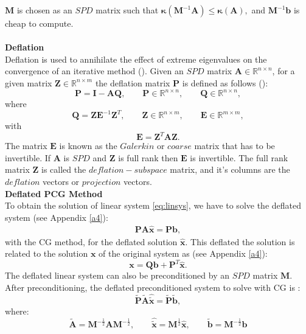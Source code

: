 \documentclass[12pt]{article}
\begin{document}
$\mathbf{M}$ is chosen as an $SPD$ matrix such that $\mathbf{\kappa}(\mathbf{M}^{-1}\mathbf{A})\leq \mathbf{\kappa}(\mathbf{A}),$ and $\mathbf{M}^{-1}\mathbf{b}$ is cheap to compute.\\\\
\textbf{Deflation}\\
Deflation is used to annihilate the effect of extreme eigenvalues on the convergence of an iterative method (\cite{Vuik99}). 
Given an $SPD$ matrix $\mathbf{A} \in \mathbb{R}^{n \times n}$, for a given matrix $\mathbf{Z}\in \mathbb{R}^{n\times m}$ the deflation matrix $\mathbf{P}$ is defined as follows (\cite{Tang08,Tang09}):
$$\mathbf{P}=\mathbf{I}-\mathbf{A}\mathbf{Q}, \qquad \mathbf{P} \in \mathbb{R}^{n \times n}, \qquad \mathbf{Q} \in \mathbb{R}^{n \times n},$$
where
$$\mathbf{Q}=\mathbf{Z}\mathbf{E}^{-1}\mathbf{Z}^T, \qquad \mathbf{Z} \in \mathbb{R}^{n \times m}, \qquad \mathbf{E} \in \mathbb{R}^{m \times m}, $$
with
$$\mathbf{E}=\mathbf{Z}^T\mathbf{A}\mathbf{Z}.$$
The matrix $\mathbf{E}$ is known as the $Galerkin$ or $coarse$ matrix that has to be invertible. 
If $\mathbf{A}$ is $SPD$ and $\mathbf{Z}$ is full rank then $\mathbf{E}$ is invertible. 
The full rank matrix $\mathbf{Z}$ is called the $deflation-subspace$ matrix, 
and it's columns are the
$deflation$ vectors or $projection$ vectors.\\
\textbf{Deflated PCG Method}\\
\hspace{0.5cm}To obtain the solution of linear system \eqref{eq:linsys}, we have to solve the deflated system (see Appendix \ref{a4}):
\begin{align}\label{eq:defsol}
\mathbf{P}\mathbf{A} \hat{\mathbf{x}}=\mathbf{P}\mathbf{b},
\end{align}
with the CG method, for the deflated solution $\hat{\mathbf{x}}$. 
This deflated the solution is related to the solution $\mathbf{x}$ of the original system as (see Appendix \ref{a4}):
\begin{equation}\label{eq:xfromxh}
    \mathbf{x}=\mathbf{Q}\mathbf{b}+\mathbf{P}^T\mathbf{\hat{x}}.
\end{equation}
The deflated linear system can also be preconditioned by an $SPD$ matrix $\mathbf{M}$. After preconditioning, the deflated preconditioned system to solve with CG is \cite{Tang09}:
$$\tilde{\mathbf{P}} \tilde{\mathbf{A}} \hat{\tilde{\mathbf{x}}}=\tilde{\mathbf{P}}\tilde{\mathbf{b}},$$
where:
\begin{equation*}
 \tilde{\mathbf{A}}=\mathbf{M}^{-\frac{1}{2}}\mathbf{A}\mathbf{M}^{-\frac{1}{2}}, \qquad \hat{\tilde{\mathbf{x}}}=\mathbf{M}^{\frac{1}{2}}\hat{\mathbf{x}}, \qquad
 \tilde{\mathbf{b}}=\mathbf{M}^{-\frac{1}{2}}\mathbf{b}
\end{equation*}
\end{document}

